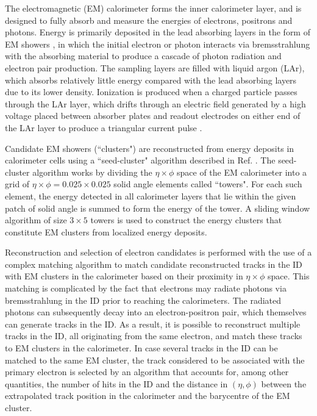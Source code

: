 The electromagnetic (EM) calorimeter forms the inner calorimeter layer, and is designed to fully absorb and measure the energies of electrons, positrons and photons. Energy is primarily deposited in the lead absorbing layers in the form of EM showers \cite{em_showers}, in which the initial electron or photon interacts via bremsstrahlung \cite{shower_theory} with the absorbing material to produce a cascade of photon radiation and electron pair production. The sampling layers are filled with liquid argon (LAr), which absorbs relatively little energy compared with the lead absorbing layers due to its lower density. Ionization is produced when a charged particle passes through the LAr \cite{em_cal} layer, which drifts through an electric field generated by a high voltage placed between absorber plates and readout electrodes on either end of the LAr layer to produce a triangular current pulse \cite{LAr_calo}. 

Candidate EM showers (``clusters") are reconstructed from energy deposits in calorimeter cells using a ``seed-cluster" algorithm described in Ref. \cite{electron_reco}. The seed-cluster algorithm works by dividing the \(\eta\times\phi\) space of the EM calorimeter into a grid of \(\eta\times\phi=0.025\times0.025\) solid angle elements called ``towers". For each such element, the energy detected in all calorimeter layers that lie within the given patch of solid angle is summed to form the energy of the tower. A sliding window algorithm of size \(3\times5\) towers is used to construct the energy clusters that constitute EM clusters from localized energy deposits.

Reconstruction and selection of electron candidates \cite{electron_reco} is performed with the use of a complex matching algorithm to match candidate reconstructed tracks in the ID with EM clusters in the calorimeter based on their proximity in \(\eta\times\phi\) space. This matching is complicated by the fact that electrons may radiate photons via bremsstrahlung in the ID prior to reaching the calorimeters. The radiated photons can subsequently decay into an electron-positron pair, which themselves can generate tracks in the ID. As a result, it is possible to reconstruct multiple tracks in the ID, all originating from the same electron, and match these tracks to EM clusters in the calorimeter. In case several tracks in the ID can be matched to the same EM cluster, the track considered to be associated with the primary electron is selected by an algorithm that accounts for, among other quantities, the number of hits in the ID and the distance in \((\eta, \phi)\) between the extrapolated track position in the calorimeter and the barycentre of the EM cluster. 

